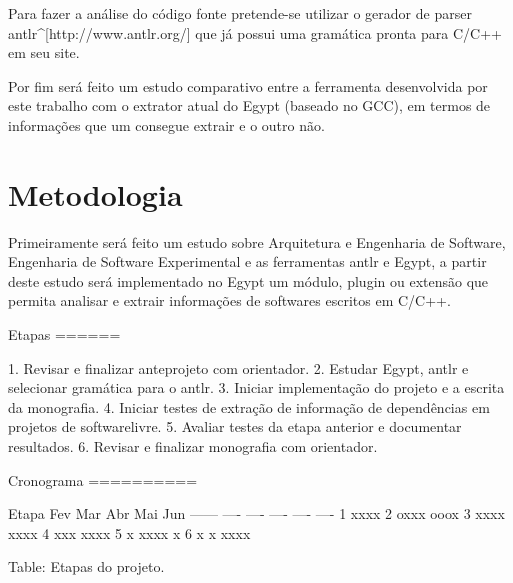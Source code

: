 Para fazer a análise do código fonte pretende-se utilizar o gerador de parser
antlr^[http://www.antlr.org/] que já possui uma gramática pronta para C/C++ em
seu site.

Por fim será feito um estudo comparativo entre a ferramenta desenvolvida por
este trabalho com o extrator atual do Egypt (baseado no GCC), em termos de
informações que um consegue extrair e o outro não.

\chapter{Metodologia}

Primeiramente será feito um estudo sobre Arquitetura e Engenharia de Software,
Engenharia de Software Experimental e as ferramentas antlr e Egypt, a partir
deste estudo será implementado no Egypt um módulo, plugin ou extensão que
permita analisar e extrair informações de softwares escritos em C/C++.

Etapas
======

1. Revisar e finalizar anteprojeto com orientador.
2. Estudar Egypt, antlr e selecionar gramática para o antlr.
3. Iniciar implementação do projeto e a escrita da monografia.
4. Iniciar testes de extração de informação de dependências em projetos de softwarelivre.
5. Avaliar testes da etapa anterior e documentar resultados.
6. Revisar e finalizar monografia com orientador.

Cronograma
==========

Etapa    Fev    Mar    Abr    Mai    Jun   
------   ----   ----   ----   ----   ----   
1        xxxx
2        oxxx   ooox
3               xxxx   xxxx
4                      xxx    xxxx
5                      x      xxxx   x
6                      x      x      xxxx

Table: Etapas do projeto.
